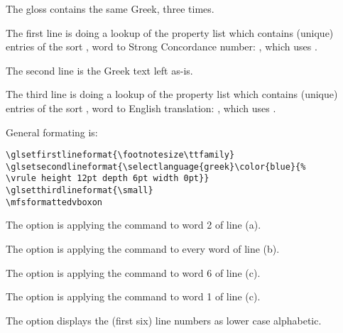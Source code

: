 \documentclass{article}
\begin{document}
%

The gloss contains the same Greek, three times.

The first line is doing a lookup of the  property list which contains (unique) entries of the sort , word to Strong Concordance number: \glmeta{[addca=pkvstrong]}, which uses .

The second line is the Greek text left as-is.

The third line is doing a lookup of the  property list which contains (unique) entries of the sort , word to English translation: \glmeta{[addcc=pkvnabeng]}, which uses .

General formating is:

\begin{verbatim}
\glsetfirstlineformat{\footnotesize\ttfamily}
\glsetsecondlineformat{\selectlanguage{greek}\color{blue}{%
\vrule height 12pt depth 6pt width 0pt}}
\glsetthirdlineformat{\small}
\mfsformattedvboxon
\end{verbatim}


\begin{exe}
\ex {} 
\glinlines[addcaw=2;doemph,
addcb=pkvcat,
addccw=6;doemph,
addcxa=3;1;doemph,
linenumsa=true,
]{%
          The cat sat on the mat. 
*/       The cat sat on the mat. 
*/    The cat sat on the mat. 
}
\end{exe}

The option  is applying the command  to word 2 of line (a).

The option  is applying the command  to every word  of line (b).

The option  is applying the command  to word 6 of line (c).

The option  is applying the command  to word 1 of line (c).

The option  displays the (first six) line numbers as lower case alphabetic.
\end{document}
